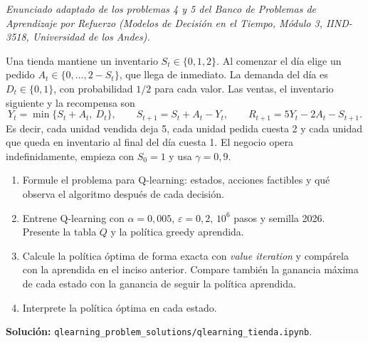 \noindent\textit{Enunciado adaptado de los problemas 4 y 5 del Banco de Problemas de Aprendizaje por Refuerzo (Modelos de Decisión en el Tiempo, Módulo 3, IIND-3518, Universidad de los Andes).}

\bigskip

\noindent Una tienda mantiene un inventario $S_t \in \{0, 1, 2\}$. Al comenzar el día elige un pedido $A_t \in \{0, \dots, 2 - S_t\}$, que llega de inmediato. La demanda del día es $D_t \in \{0, 1\}$, con probabilidad $1/2$ para cada valor. Las ventas, el inventario siguiente y la recompensa son
\[
Y_t = \min\{S_t + A_t,\ D_t\}, \qquad S_{t+1} = S_t + A_t - Y_t, \qquad R_{t+1} = 5Y_t - 2A_t - S_{t+1}.
\]
Es decir, cada unidad vendida deja 5, cada unidad pedida cuesta 2 y cada unidad que queda en inventario al final del día cuesta 1. El negocio opera indefinidamente, empieza con $S_0 = 1$ y usa $\gamma = 0{,}9$.

\begin{enumerate}
\item Formule el problema para Q-learning: estados, acciones factibles y qué observa el algoritmo después de cada decisión.
\item Entrene Q-learning con $\alpha = 0{,}005$, $\varepsilon = 0{,}2$, $10^6$ pasos y semilla 2026. Presente la tabla $Q$ y la política greedy aprendida.
\item Calcule la política óptima de forma exacta con \emph{value iteration} y compárela con la aprendida en el inciso anterior. Compare también la ganancia máxima de cada estado con la ganancia de seguir la política aprendida.
\item Interprete la política óptima en cada estado.
\end{enumerate}

\noindent\textbf{Solución:} \texttt{qlearning\_problem\_solutions/qlearning\_tienda.ipynb}.
